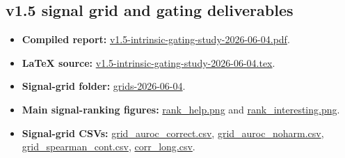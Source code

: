 \documentclass[11pt]{article}
\begin{document}
\subsection{v1.5 signal grid and gating deliverables}
\begin{itemize}
\item \textbf{Compiled report:}
\href{https://github.com/BDeMo/research-notes/blob/main/notes/plans/08-model-outputs-delta-w/summary/2026-06-04/v1.5-intrinsic-gating-study-2026-06-04.pdf}{v1.5-intrinsic-gating-study-2026-06-04.pdf}.
\item \textbf{LaTeX source:}
\href{https://github.com/BDeMo/research-notes/blob/main/notes/plans/08-model-outputs-delta-w/summary/2026-06-04/v1.5-intrinsic-gating-study-2026-06-04.tex}{v1.5-intrinsic-gating-study-2026-06-04.tex}.
\item \textbf{Signal-grid folder:}
\href{https://github.com/BDeMo/research-notes/tree/main/notes/plans/08-model-outputs-delta-w/raw/grids-2026-06-04}{grids-2026-06-04}.
\item \textbf{Main signal-ranking figures:}
\href{https://github.com/BDeMo/research-notes/blob/main/notes/plans/08-model-outputs-delta-w/raw/grids-2026-06-04/rank_help.png}{rank\_help.png}
and
\href{https://github.com/BDeMo/research-notes/blob/main/notes/plans/08-model-outputs-delta-w/raw/grids-2026-06-04/rank_interesting.png}{rank\_interesting.png}.
\item \textbf{Signal-grid CSVs:}
\href{https://github.com/BDeMo/research-notes/blob/main/notes/plans/08-model-outputs-delta-w/raw/grids-2026-06-04/grid_auroc_correct.csv}{grid\_auroc\_correct.csv},
\href{https://github.com/BDeMo/research-notes/blob/main/notes/plans/08-model-outputs-delta-w/raw/grids-2026-06-04/grid_auroc_noharm.csv}{grid\_auroc\_noharm.csv},
\href{https://github.com/BDeMo/research-notes/blob/main/notes/plans/08-model-outputs-delta-w/raw/grids-2026-06-04/grid_spearman_cont.csv}{grid\_spearman\_cont.csv},
\href{https://github.com/BDeMo/research-notes/blob/main/notes/plans/08-model-outputs-delta-w/raw/grids-2026-06-04/corr_long.csv}{corr\_long.csv}.
\end{itemize}
\end{document}
